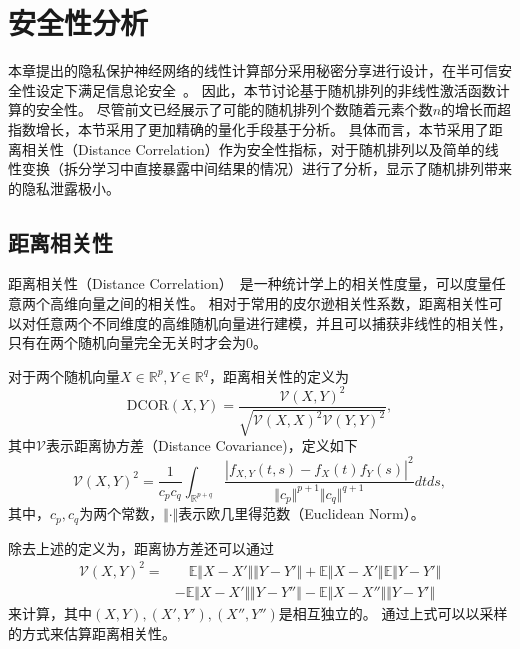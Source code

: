 \section{安全性分析}
本章提出的隐私保护神经网络的线性计算部分采用秘密分享进行设计，在半可信安全性设定下满足信息论安全~\cite{demmler2015aby}。
%
因此，本节讨论基于随机排列的非线性激活函数计算的安全性。
%
尽管前文已经展示了可能的随机排列个数随着元素个数$n$的增长而超指数增长，本节采用了更加精确的量化手段基于分析。
%
具体而言，本节采用了距离相关性（Distance Correlation）作为安全性指标，对于随机排列以及简单的线性变换（拆分学习中直接暴露中间结果的情况）进行了分析，显示了随机排列带来的隐私泄露极小。

\subsection{距离相关性}
距离相关性（Distance Correlation）~\cite{szekely2007dcor,szekely2009brownian_dcor}是一种统计学上的相关性度量，可以度量任意两个高维向量之间的相关性。
相对于常用的皮尔逊相关性系数，距离相关性可以对任意两个不同维度的高维随机向量进行建模，并且可以捕获非线性的相关性，只有在两个随机向量完全无关时才会为0。
%
\begin{definition}[距离相关性]
    对于两个随机向量$X \in \mathbb R^p, Y\in \mathbb R^q$，距离相关性的定义为
    \begin{equation}
        \text{DCOR}(X, Y) = \dfrac{\mathcal{V}(X, Y)^2}{\sqrt{\mathcal{V}(X, X)^2\mathcal{V}(Y, Y)^2}},
    \end{equation}
    其中$\mathcal{V}$表示距离协方差（Distance Covariance)，定义如下
    \begin{equation}
        \mathcal{V}(X, Y)^2 = \dfrac{1}{c_pc_q} \int_{\mathbb R^{p + q}}
        \dfrac{|f_{X, Y}(t, s) - f_X(t)f_Y(s)|^2}{\Vert c_p \Vert^{p+1}\Vert c_q \Vert^{q+1}}dtds,
    \end{equation}
    其中，$c_p, c_q$为两个常数，$\Vert \cdot \Vert$表示欧几里得范数（Euclidean Norm）。
\end{definition}

除去上述的定义为，距离协方差还可以通过
\begin{equation}
\begin{split}
    \mathcal{V}(X, Y)^2 = 
    & \quad \mathbb E \Vert X-X'\Vert \Vert Y -Y'\Vert +\mathbb E\Vert X -X' \Vert \mathbb E \Vert Y -Y' \Vert
    \\ & 
    - \mathbb E\Vert X-X'\Vert  \Vert Y -Y''\Vert - \mathbb E \Vert X -X''\Vert  \Vert Y -Y' \Vert
\end{split}
\end{equation}
来计算，其中$(X, Y), (X', Y'), (X'', Y'')$是相互独立的。
%
通过上式可以以采样的方式来估算距离相关性。

